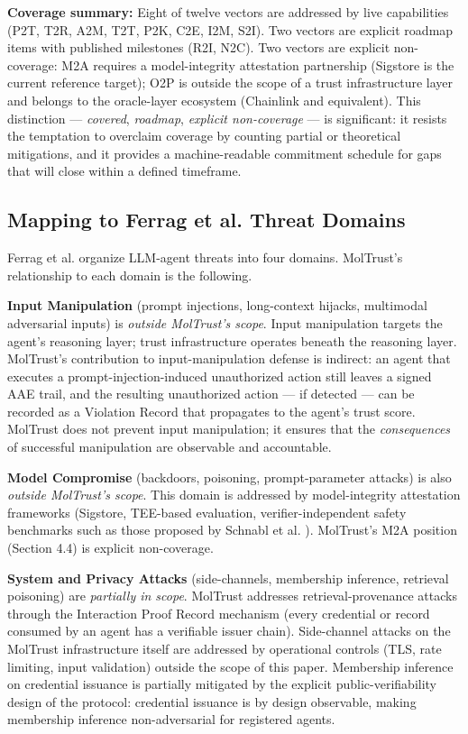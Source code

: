 \textbf{Coverage summary:} Eight of twelve vectors are addressed by live capabilities (P2T, T2R, A2M, T2T, P2K, C2E, I2M, S2I). Two vectors are explicit roadmap items with published milestones (R2I, N2C). Two vectors are explicit non-coverage: M2A requires a model-integrity attestation partnership (Sigstore is the current reference target); O2P is outside the scope of a trust infrastructure layer and belongs to the oracle-layer ecosystem (Chainlink and equivalent). This distinction — \textit{covered}, \textit{roadmap}, \textit{explicit non-coverage} — is significant: it resists the temptation to overclaim coverage by counting partial or theoretical mitigations, and it provides a machine-readable commitment schedule for gaps that will close within a defined timeframe.


\subsection{Mapping to Ferrag et al. Threat Domains}

Ferrag et al. \cite{ref18_ferrag} organize LLM-agent threats into four domains. MolTrust's relationship to each domain is the following.


\textbf{Input Manipulation} (prompt injections, long-context hijacks, multimodal adversarial inputs) is \textit{outside MolTrust's scope}. Input manipulation targets the agent's reasoning layer; trust infrastructure operates beneath the reasoning layer. MolTrust's contribution to input-manipulation defense is indirect: an agent that executes a prompt-injection-induced unauthorized action still leaves a signed AAE trail, and the resulting unauthorized action — if detected — can be recorded as a Violation Record that propagates to the agent's trust score. MolTrust does not prevent input manipulation; it ensures that the \textit{consequences} of successful manipulation are observable and accountable.


\textbf{Model Compromise} (backdoors, poisoning, prompt-parameter attacks) is also \textit{outside MolTrust's scope}. This domain is addressed by model-integrity attestation frameworks (Sigstore, TEE-based evaluation, verifier-independent safety benchmarks such as those proposed by Schnabl et al. \cite{ref33_schnabl}). MolTrust's M2A position (Section 4.4) is explicit non-coverage.


\textbf{System and Privacy Attacks} (side-channels, membership inference, retrieval poisoning) are \textit{partially in scope}. MolTrust addresses retrieval-provenance attacks through the Interaction Proof Record mechanism (every credential or record consumed by an agent has a verifiable issuer chain). Side-channel attacks on the MolTrust infrastructure itself are addressed by operational controls (TLS, rate limiting, input validation) outside the scope of this paper. Membership inference on credential issuance is partially mitigated by the explicit public-verifiability design of the protocol: credential issuance is by design observable, making membership inference non-adversarial for registered agents.


